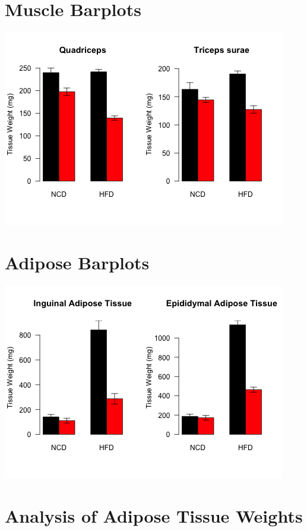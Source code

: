 \documentclass[]{article}
\begin{document}
\section{Muscle Barplots}\label{muscle-barplots}

\includegraphics{figures/muscle-weight-barplot-1.png}

\section{Adipose Barplots}\label{adipose-barplots}

\includegraphics{figures/adipose-weight-barplot-1.png}

\section{Analysis of Adipose Tissue
Weights}\label{analysis-of-adipose-tissue-weights}
\end{document}

